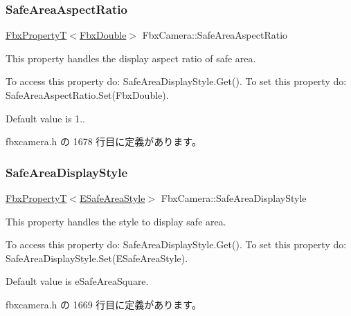 \mbox{\label{class_fbx_camera_aeb22ecb7b5a1551e735e9cf222d79b6d}} 
\subsubsection{\texorpdfstring{Safe\+Area\+Aspect\+Ratio}{SafeAreaAspectRatio}}
{\footnotesize\ttfamily \hyperlink{class_fbx_property_t}{Fbx\+PropertyT}$<$\hyperlink{fbxtypes_8h_a171e72a1c46fc15c1a6c9c31948c1c5b}{Fbx\+Double}$>$ Fbx\+Camera\+::\+Safe\+Area\+Aspect\+Ratio}

This property handles the display aspect ratio of safe area.

To access this property do\+: Safe\+Area\+Display\+Style.\+Get(). To set this property do\+: Safe\+Area\+Aspect\+Ratio.\+Set(\+Fbx\+Double).

Default value is 1.. 

 fbxcamera.\+h の 1678 行目に定義があります。

\mbox{\label{class_fbx_camera_a48f27fb4b475f1ee7d2ace77cc860ad3}} 
\subsubsection{\texorpdfstring{Safe\+Area\+Display\+Style}{SafeAreaDisplayStyle}}
{\footnotesize\ttfamily \hyperlink{class_fbx_property_t}{Fbx\+PropertyT}$<$\hyperlink{class_fbx_camera_aa9fb36da95d392ac56ff2d8b44171210}{E\+Safe\+Area\+Style}$>$ Fbx\+Camera\+::\+Safe\+Area\+Display\+Style}

This property handles the style to display safe area.

To access this property do\+: Safe\+Area\+Display\+Style.\+Get(). To set this property do\+: Safe\+Area\+Display\+Style.\+Set(\+E\+Safe\+Area\+Style).

Default value is e\+Safe\+Area\+Square. 

 fbxcamera.\+h の 1669 行目に定義があります。

\mbox{\label{class_fbx_camera_ad2c18755bf884d3ce15566dc90cc3d97}} 
